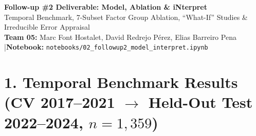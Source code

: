 \documentclass[10pt,a4paper]{article}
\begin{document}
\begin{center}
  {\LARGE\bfseries\color{navy} Follow-up \#2 Deliverable: Model, Ablation \& iNterpret}\\[4pt]
  {\large Temporal Benchmark, 7-Subset Factor Group Ablation, ``What-If'' Studies \& Irreducible Error Appraisal}\\[5pt]
  {\small\color{slate} \textbf{Team 05:} Marc Font Hostalet, David Redrejo P\'erez, Elias Barreiro Pena \quad|\quad \textbf{Notebook:} \texttt{notebooks/02\_followup2\_model\_interpret.ipynb}}
\end{center}
\vspace{-4pt}

\section{1. Temporal Benchmark Results (CV 2017--2021 $\rightarrow$ Held-Out Test 2022--2024, $n=1{,}359$)}
\end{document}
